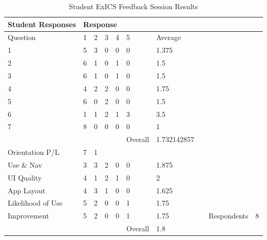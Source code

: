 \begin{table}[h]
\centering
\begin{tabular}{|l|l|l|l|l|l|l|l|ll|}
\hline
Student Responses & \multicolumn{9}{l}{Response}                     \\
\hline
Question          & 1        & 2 & 3 & 4 & 5 & Average &  &             &   \\
\hline
1                 & 5        & 3 & 0 & 0 & 0 & 1.375   &  &             &   \\
2                 & 6        & 1 & 0 & 1 & 0 & 1.5     &  &             &   \\
3                 & 6        & 1 & 0 & 1 & 0 & 1.5     &  &             &   \\
4                 & 4        & 2 & 2 & 0 & 0 & 1.75    &  &             &   \\
5                 & 6        & 0 & 2 & 0 & 0 & 1.5     &  &             &   \\
6                 & 1        & 1 & 2 & 1 & 3 & 3.5     &  &             &   \\
7                 & 8        & 0 & 0 & 0 & 0 & 1       &  &             &   \\
\hline
                  &          &   &   &   & Overall  & 1.732142857  &  &    &   \\
\hline
Orientation P/L   & 7        & 1 &   &   &   &         &  &             &   \\
Use \& Nav        & 3        & 3 & 2 & 0 & 0 & 1.875   &  &             &   \\
UI Quality        & 4        & 1 & 2 & 1 & 0 & 2       &  &             &   \\
App Layout        & 4        & 3 & 1 & 0 & 0 & 1.625   &  &             &   \\
Likelihood of Use & 5        & 2 & 0 & 0 & 1 & 1.75    &  &             &   \\
Improvement       & 5        & 2 & 0 & 0 & 1 & 1.75    &  & Respondents & 8 \\
\hline
                  &          &   &   &   & Overall  &  1.8 &  &     &   \\
\hline
\end{tabular}
\caption{Student ExICS Feedback Session Results}
\label{tab:stud_results}
\end{table}

\FloatBarrier

